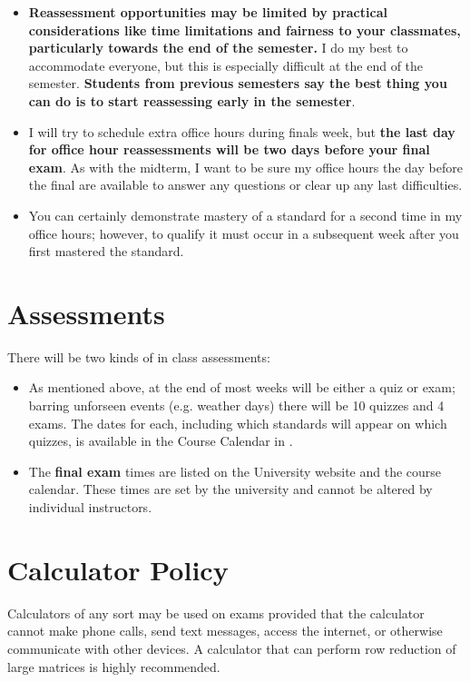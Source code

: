 \documentclass{article}
\begin{document}
\begin{enumerate}[1)]
\begin{itemize}
    \item \textbf{Reassessment opportunities may be limited by practical considerations like time limitations and fairness to your classmates, particularly towards the end of the semester.}  I do my best to accommodate everyone, but this is especially difficult at the end of the semester.  {\bf Students from previous semesters say the best thing you can do is to start reassessing early in the semester}.
    \item I will try to schedule extra office hours during finals week, but \textbf{the last day for office hour reassessments will be two days before your final exam}.  As with the midterm, I want to be sure my office hours the day before the final are available to answer any questions or clear up any last difficulties.
    \item You can certainly demonstrate mastery of a standard for a second time in my office hours; however, to qualify it must occur in a subsequent week after you first mastered the standard.
    \end{itemize}
    \end{enumerate}




\section*{\fontsize{12}{15}\selectfont Assessments}
There will be two kinds of in class assessments:
\begin{itemize}
\item As mentioned above, at the end of most weeks will be either a quiz or exam; barring unforseen events (e.g. weather days) there will be 10 quizzes and 4 exams.   The dates for each, including which standards will appear on which quizzes, is available in the Course Calendar in \LMS.
\item The {\bf final exam} times are listed on the University website and the course calendar. These times are set by the university and cannot be altered by individual instructors.
\end{itemize}

\section*{\fontsize{12}{15}\selectfont Calculator Policy}

Calculators of any sort may be used on exams provided that the calculator cannot make phone calls, send text messages, access the internet, or otherwise communicate with other devices.  A calculator that can perform row reduction of large matrices is highly recommended.
\end{document}
